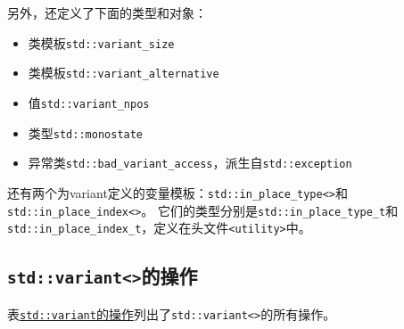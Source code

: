 另外，还定义了下面的类型和对象：
\begin{itemize}
    \item 类模板\texttt{std::variant\_size}
    \item 类模板\texttt{std::variant\_alternative}
    \item 值\texttt{std::variant\_npos}
    \item 类型\texttt{std::monostate}
    \item 异常类\texttt{std::bad\_variant\_access}，派生自\texttt{std::exception}
\end{itemize}
还有两个为variant定义的变量模板：\texttt{std::in\_place\_type<>}和\texttt{std::in\_place\_index<>}。
它们的类型分别是\texttt{std::in\_place\_type\_t}和
\texttt{std::in\_place\_index\_t}，定义在头文件\texttt{<utility>}中。

\subsection{\texttt{std::variant<>}的操作}
表\hyperref[t16.1]{\texttt{std::variant}的操作}列出了\texttt{std::variant<>}的所有操作。
